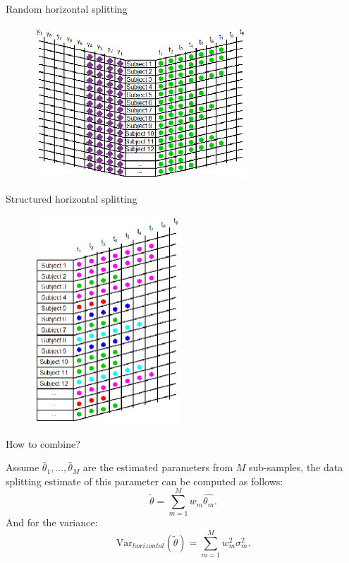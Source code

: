 \documentclass{beamer}
\begin{document}
\begin{frame}{Random horizontal splitting}

\begin{figure}
\centering
\includegraphics[width=8cm]{long.eps}
\end{figure} 
\end{frame}

\begin{frame}{Structured horizontal splitting}

\begin{figure}
\centering
\includegraphics[width=5.5cm]{plot2.eps}
\end{figure} 
\end{frame}

\begin{frame}{How to combine?}

Assume $\widehat{\theta}_1, \ldots, \widehat{\theta}_M$ are the estimated parameters from $M$ sub-samples, the data splitting estimate of this parameter can be computed as follows:
$$\widetilde{\theta} = \sum_{m=1}^M w_m\widehat{\theta_m}.$$
And for the variance:
$$\mathrm{Var}_{horizontal}(\widetilde{\theta}) = \sum_{m=1}^M w_m^2 \sigma_m^2.$$
\end{frame}
\end{document}
